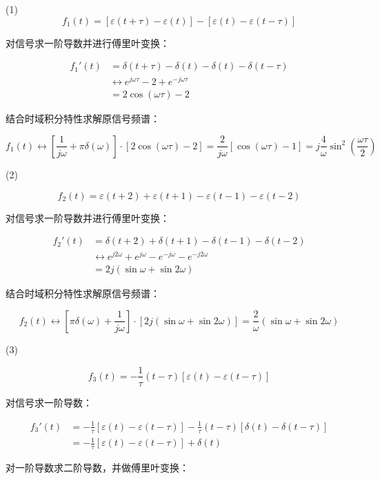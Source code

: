 \documentclass[UTF8]{ctexart}
\begin{document}
\begin{solution}
(1)
$$
f_{1}(t)=[\varepsilon(t+\tau)-\varepsilon(t)]-[\varepsilon(t)-\varepsilon(t-\tau)]
$$

对信号求一阶导数并进行傅里叶变换：

$$
\begin{aligned}
f_{1}'(t) &= \delta(t+\tau)-\delta(t)-\delta(t)-\delta(t-\tau) \\
&\leftrightarrow e^{j \omega \tau}-2+e^{-j \omega \tau} \\
&= 2 \cos (\omega \tau)-2
\end{aligned}
$$

结合时域积分特性求解原信号频谱：

$$
f_{1}(t) \leftrightarrow\left[\frac{1}{j \omega}+\pi \delta(\omega)\right] \cdot[2 \cos (\omega \tau)-2]=\frac{2}{j \omega}[\cos (\omega \tau)-1]=j \frac{4}{\omega} \sin ^{2}\left(\frac{\omega \tau}{2}\right)
$$

(2)

$$
f_{2}(t)=\varepsilon(t+2)+\varepsilon(t+1)-\varepsilon(t-1)-\varepsilon(t-2)
$$

对信号求一阶导数并进行傅里叶变换：

$$
\begin{aligned}
f_{2}'(t) &= \delta(t+2)+\delta(t+1)-\delta(t-1)-\delta(t-2) \\
&\leftrightarrow e^{j 2 \omega}+e^{j \omega}-e^{-j \omega}-e^{-j 2 \omega} \\
&= 2 j(\sin \omega+\sin 2 \omega)
\end{aligned}
$$

结合时域积分特性求解原信号频谱：

$$
f_{2}(t) \leftrightarrow\left[\pi \delta(\omega)+\frac{1}{j \omega}\right] \cdot[2 j(\sin \omega+\sin 2 \omega)]=\frac{2}{\omega}(\sin \omega+\sin 2 \omega)
$$

(3)

$$
f_{3}(t)=-\frac{1}{\tau}(t-\tau)[\varepsilon(t)-\varepsilon(t-\tau)]
$$

对信号求一阶导数：

$$
\begin{aligned}
f_{3}'(t) &= -\frac{1}{\tau}[\varepsilon(t)-\varepsilon(t-\tau)]-\frac{1}{\tau}(t-\tau)[\delta(t)-\delta(t-\tau)] \\
&= -\frac{1}{\tau}[\varepsilon(t)-\varepsilon(t-\tau)]+\delta(t)
\end{aligned}
$$

对一阶导数求二阶导数，并做傅里叶变换：


\end{solution}
\end{document}
